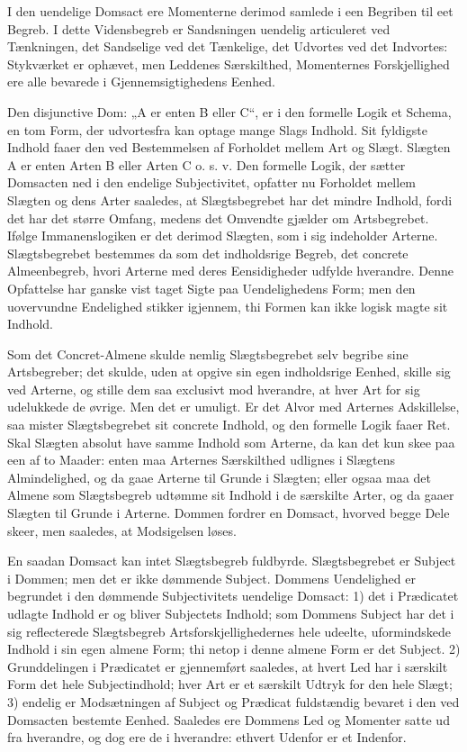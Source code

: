 \documentclass[12pt]{book}
\newcommand{\opage}[1]{\marginnote{\footnotesize\textit{[#1]}}}
\begin{document}
I den uendelige Domsact ere Momenterne derimod samlede i een Begriben
til eet Begreb. I dette Vidensbegreb er Sandsningen uendelig
articuleret ved Tænkningen, det Sandselige ved det Tænkelige, det
Udvortes ved det Indvortes: Stykværket er ophævet, men Leddenes
Særskilthed, Momenternes Forskjellighed ere alle bevarede i
Gjennemsigtighedens Eenhed.

Den disjunctive Dom: „A er enten B eller C“, er i den formelle Logik
et Schema, en tom Form, der udvortesfra kan optage mange Slags
Indhold. Sit fyldigste Indhold faaer den ved Bestemmelsen af
Forholdet mellem Art og Slægt. Slægten A er enten Arten B eller Arten
C o. s. v. Den formelle Logik, der sætter Domsacten ned i den
endelige Subjectivitet, opfatter nu Forholdet mellem Slægten og dens
Arter saaledes, at Slægtsbegrebet har det mindre Indhold, fordi det
har det større Omfang, medens det Omvendte gjælder om Artsbegrebet.
Ifølge Immanenslogiken er det derimod Slægten, som i sig indeholder
Arterne. Slægtsbegrebet bestemmes da som det indholdsrige Begreb, det
concrete Almeenbegreb, hvori Arterne med deres Eensidigheder udfylde
hverandre. Denne Opfattelse har ganske vist taget Sigte paa
Uendelighedens Form; men den uovervundne Endelighed stikker
igjennem, thi Formen kan ikke logisk magte sit Indhold.

Som det Concret-Almene skulde nemlig Slægtsbegrebet
\opage{19} selv begribe sine Artsbegreber; det skulde, uden at opgive sin egen
indholdsrige Eenhed, skille sig ved Arterne, og stille dem saa
exclusivt mod hverandre, at hver Art for sig udelukkede de øvrige.
Men det er umuligt. Er det Alvor med Arternes Adskillelse, saa mister
Slægtsbegrebet sit concrete Indhold, og den formelle Logik faaer Ret.
Skal Slægten absolut have samme Indhold som Arterne, da kan det kun
skee paa een af to Maader: enten maa Arternes Særskilthed udlignes i
Slægtens Almindelighed, og da gaae Arterne til Grunde i Slægten;
eller ogsaa maa det Almene som Slægtsbegreb udtømme sit Indhold i de
særskilte Arter, og da gaaer Slægten til Grunde i Arterne. Dommen
fordrer en Domsact, hvorved begge Dele skeer, men saaledes, at
Modsigelsen løses.

En saadan Domsact kan intet Slægtsbegreb fuldbyrde. Slægtsbegrebet er
Subject i Dommen; men det er ikke dømmende Subject. Dommens
Uendelighed er begrundet i den dømmende Subjectivitets uendelige
Domsact: 1) det i Prædicatet udlagte Indhold er og bliver Subjectets
Indhold; som Dommens Subject har det i sig reflecterede Slægtsbegreb
Artsforskjellighedernes hele udeelte, uformindskede Indhold i sin
egen almene Form; thi netop i denne almene Form er det Subject.
2) Grunddelingen i Prædicatet er gjennemført saaledes, at hvert Led
har i særskilt Form det hele Subjectindhold; hver Art er et særskilt
Udtryk for den hele Slægt; 3) endelig er Modsætningen af Subject og
Prædicat fuldstændig bevaret i den ved Domsacten bestemte Eenhed.
Saaledes ere Dommens Led og Momenter satte ud fra hverandre, og dog
ere de i hverandre: ethvert Udenfor er et Indenfor.
\end{document}
